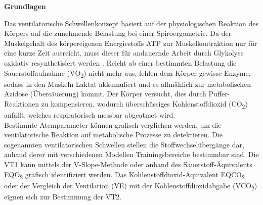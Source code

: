 \begin{center} \textbf{\Large Grundlagen} \end{center}

Das ventilatorische Schwellenkonzept basiert auf der physiologischen Reaktion des Körpers auf die zunehmende Belastung bei einer Spiroergometrie. Da der Muskelgehalt des körpereigenen Energiestoffs ATP zur Muskelkontraktion nur für eine kurze Zeit ausreicht, muss dieser für andauernde Arbeit durch Glykolyse oxidativ resynthetisiert werden \cite{Kroidl.2015}. Reicht ab einer bestimmten Belastung die Sauerstoffaufnahme (\.{V}O\textsubscript{2}) nicht mehr aus, fehlen dem Körper gewisse Enzyme, sodass in den Muskeln Laktat akkumuliert und es allmählich zur metabolischen Azidose (Übersäuerung) kommt. Der Körper versucht, dies durch Puffer-Reaktionen zu kompensieren, wodurch überschüssiges Kohlenstoffdioxid (CO\textsubscript{2}) anfällt, welches respiratorisch messbar abgeatmet wird.\\
Bestimmte Atemparameter können grafisch verglichen werden, um die ventilatorische Reaktion auf metabolische Prozesse zu detektieren. Die sogenannten ventilatorischen Schwellen stellen die Stoffwechselübergänge dar, anhand derer mit verschiedenen Modellen Trainingsbereiche bestimmbar sind. Die VT1 kann mittels der V-Slope-Methode oder anhand des Sauerstoff-Äquivalents EQO\textsubscript{2} grafisch identifiziert werden. Das Kohlenstoffdioxid-Äquivalent EQCO\textsubscript{2} oder der Vergleich der Ventilation (\.{V}E) mit der Kohlenstoffdioxidabgabe (\.{V}CO\textsubscript{2}) eignen sich zur Bestimmung der VT2.\\

